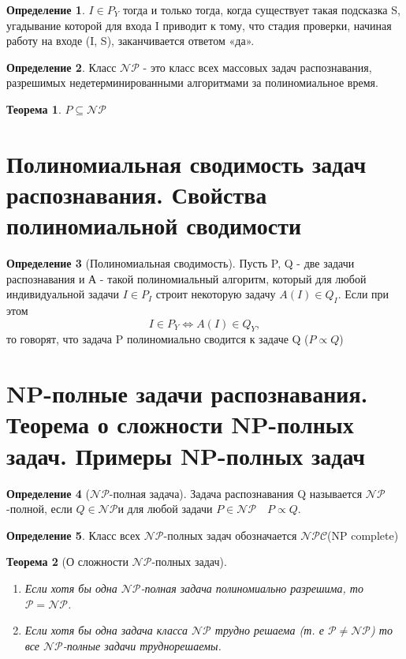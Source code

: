 \documentclass[a4paper]{article}
\newtheorem{theorem}{Теорема}[section]
\theoremstyle{definition}
\newtheorem*{definition}{Определение}
\theoremstyle{remark}
\begin{document}
\begin{multicols*}{2}
\begin{definition}
        $I\in P_Y$ тогда и только тогда, когда существует такая подсказка S, угадывание которой для входа I приводит к тому, что стадия проверки, начиная работу на входе (I, S), заканчивается ответом «да».
    \end{definition}
    \begin{definition}
        Класс $\mathcal{NP}$ - это класс всех массовых задач распознавания, разрешимых недетерминированными алгоритмами за полиномиальное время.
    \end{definition}
    \begin{theorem}
        $P \subseteq \mathcal{NP}$
    \end{theorem}
    \section{Полиномиальная сводимость задач распознавания. Свойства полиномиальной 
    сводимости}
    \begin{definition}[Полиномиальная сводимость]
        Пусть P, Q - две задачи распознавания и А - такой полиномиальный алгоритм, который для любой индивидуальной задачи $I \in P_I$ строит некоторую задачу $A(I) \in Q_I$. Если при этом $$I\in P_Y \Leftrightarrow A(I) \in Q_Y,$$ то говорят, что задача P полиномиально сводится к задаче Q ($P\propto Q$)
    \end{definition}
    \section{NP-полные задачи распознавания. Теорема о сложности NP-полных задач. Примеры 
    NP-полных задач}
    \begin{definition}[$\mathcal{NP}$-полная задача]
        Задача распознавания Q называется $\mathcal{NP}$-полной, если $Q\in\mathcal{NP} $и для любой задачи $P\in\mathcal{NP}\quad P\propto Q$.
    \end{definition}
    \begin{definition}
        Класс всех $\mathcal{NP}$-полных задач обозначается $\mathcal{NPC}$(NP complete)
    \end{definition}
    \begin{theorem}[О сложности $\mathcal{NP}$-полных задач]
        \begin{enumerate}
            \item Если хотя бы одна $\mathcal{NP}$-полная задача полиномиально разрешима, то $\mathcal{P} = \mathcal{NP}$.
            \item Если хотя бы одна задача класса $\mathcal{NP}$ трудно решаема (т. е $\mathcal{P}\neq\mathcal{NP}$) то все $\mathcal{NP}$-полные задачи труднорешаемы.
        \end{enumerate}
    \end{theorem}
\end{multicols*}
\end{document}
